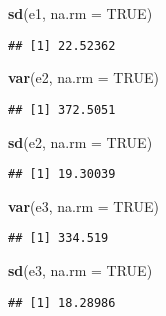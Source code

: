 \documentclass[
]{article}
\newenvironment{Shaded}{\begin{snugshade}}{\end{snugshade}}
\newcommand{\AttributeTok}[1]{\textcolor[rgb]{0.13,0.29,0.53}{#1}}
\newcommand{\ConstantTok}[1]{\textcolor[rgb]{0.56,0.35,0.01}{#1}}
\newcommand{\FunctionTok}[1]{\textcolor[rgb]{0.13,0.29,0.53}{\textbf{#1}}}
\newcommand{\NormalTok}[1]{#1}
\begin{document}
\begin{Shaded}
\begin{Highlighting}[]
\FunctionTok{sd}\NormalTok{(e1, }\AttributeTok{na.rm =} \ConstantTok{TRUE}\NormalTok{)}
\end{Highlighting}
\end{Shaded}

\begin{verbatim}
## [1] 22.52362
\end{verbatim}

\begin{Shaded}
\begin{Highlighting}[]
\FunctionTok{var}\NormalTok{(e2, }\AttributeTok{na.rm =} \ConstantTok{TRUE}\NormalTok{)}
\end{Highlighting}
\end{Shaded}

\begin{verbatim}
## [1] 372.5051
\end{verbatim}

\begin{Shaded}
\begin{Highlighting}[]
\FunctionTok{sd}\NormalTok{(e2, }\AttributeTok{na.rm =} \ConstantTok{TRUE}\NormalTok{)}
\end{Highlighting}
\end{Shaded}

\begin{verbatim}
## [1] 19.30039
\end{verbatim}

\begin{Shaded}
\begin{Highlighting}[]
\FunctionTok{var}\NormalTok{(e3, }\AttributeTok{na.rm =} \ConstantTok{TRUE}\NormalTok{)}
\end{Highlighting}
\end{Shaded}

\begin{verbatim}
## [1] 334.519
\end{verbatim}

\begin{Shaded}
\begin{Highlighting}[]
\FunctionTok{sd}\NormalTok{(e3, }\AttributeTok{na.rm =} \ConstantTok{TRUE}\NormalTok{)}
\end{Highlighting}
\end{Shaded}

\begin{verbatim}
## [1] 18.28986
\end{verbatim}
\end{document}
